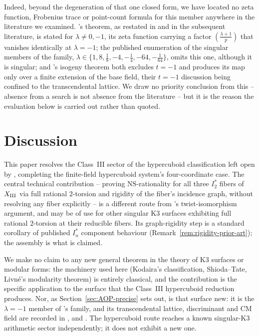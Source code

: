 \documentclass[11pt]{amsart}
\theoremstyle{definition}
\newcommand{\NS}{\mathrm{NS}}
\begin{document}
Indeed, beyond the degeneration of that one closed form, we have located
no zeta function, Frobenius trace or point-count formula for this member
anywhere in the literature we examined. \cite{AOP2002}'s theorem, as
restated in \cite{AmirHong2021} and in the subsequent literature, is
stated for $\lambda\neq0,-1$, its zeta function carrying a factor
$\left(\frac{\lambda+1}{p}\right)$ that vanishes identically at
$\lambda=-1$; the published enumeration of the singular members of the
family, $\lambda\in\{1,8,\tfrac18,-4,-\tfrac14,-64,-\tfrac1{64}\}$, omits
this one, although it is singular; and \cite{vanGeemenTop2006}'s isogeny
theorem both excludes $t=-1$ and produces its map only over a finite
extension of the base field, their $t=-1$ discussion being confined to
the transcendental lattice. We draw no priority conclusion from this --
absence from a search is not absence from the literature -- but it is the
reason the evaluation below is carried out rather than quoted.

\section{Discussion}

This paper resolves the Class~III sector of the hypercuboid
classification left open by \cite{ClassesI_II}, completing the
finite-field hypercuboid system's four-coordinate case. The central
technical contribution -- proving $\NS$-rationality for all three $I_2^*$
fibers of $X_{\rm III}$ via full rational $2$-torsion and rigidity of the
fiber's incidence graph, without resolving any fiber explicitly -- is a
different route from \cite{ClassesI_II}'s twist-isomorphism argument, and
may be of use for other singular K3 surfaces exhibiting full rational
$2$-torsion at their reducible fibers. Its graph-rigidity step is a
standard corollary of published $I_n^*$ component behaviour
(Remark~\ref{rem:rigidity-prior-art}); the assembly is what is claimed.

We make no claim to any new general theorem in the theory of K3 surfaces
or modular forms: the machinery used here (Kodaira's classification,
Shioda--Tate, Livn\'e's modularity theorem) is entirely classical, and
the contribution is the specific application to the surface that the
Class~III hypercuboid reduction produces. Nor, as
Section~\ref{sec:AOP-precise} sets out, is that surface new: it is the
$\lambda=-1$ member of \cite{AOP2002}'s family, and its transcendental
lattice, discriminant and CM field are recorded in
\cite{vanGeemenTop2006}, \cite{Persson1985} and \cite{ShiodaInose1977}.
The hypercuboid route reaches a known singular-K3 arithmetic sector
independently; it does not exhibit a new one.
\end{document}
